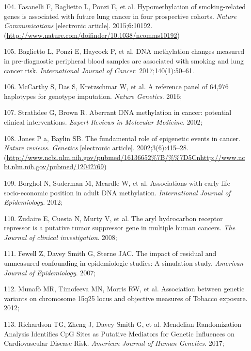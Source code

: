 \documentclass[11pt,twoside]{bristolthesis}
\newenvironment{cslreferences}%
  {}%
  {\par}
\begin{document}
\begin{cslreferences}
\leavevmode\hypertarget{ref-Fasanelli2015}{}%
104. Fasanelli F, Baglietto L, Ponzi E, et al. Hypomethylation of smoking-related genes is associated with future lung cancer in four prospective cohorts. \emph{Nature Communications} {[}electronic article{]}. 2015;6:10192. (\url{http://www.nature.com/doifinder/10.1038/ncomms10192})

\leavevmode\hypertarget{ref-Baglietto2017}{}%
105. Baglietto L, Ponzi E, Haycock P, et al. DNA methylation changes measured in pre-diagnostic peripheral blood samples are associated with smoking and lung cancer risk. \emph{International Journal of Cancer}. 2017;140(1):50--61.

\leavevmode\hypertarget{ref-McCarthy2016}{}%
106. McCarthy S, Das S, Kretzschmar W, et al. A reference panel of 64,976 haplotypes for genotype imputation. \emph{Nature Genetics}. 2016;

\leavevmode\hypertarget{ref-Strathdee2002}{}%
107. Strathdee G, Brown R. Aberrant DNA methylation in cancer: potential clinical interventions. \emph{Expert Reviews in Molecular Medicine}. 2002;

\leavevmode\hypertarget{ref-Jones2002}{}%
108. Jones P a, Baylin SB. The fundamental role of epigenetic events in cancer. \emph{Nature reviews. Genetics} {[}electronic article{]}. 2002;3(6):415--28. (\url{http://www.ncbi.nlm.nih.gov/pubmed/16136652\%7B/\%\%7D5Cnhttp://www.ncbi.nlm.nih.gov/pubmed/12042769})

\leavevmode\hypertarget{ref-Borghol2012}{}%
109. Borghol N, Suderman M, Mcardle W, et al. Associations with early-life socio-economic position in adult DNA methylation. \emph{International Journal of Epidemiology}. 2012;

\leavevmode\hypertarget{ref-Zudaire2008}{}%
110. Zudaire E, Cuesta N, Murty V, et al. The aryl hydrocarbon receptor repressor is a putative tumor suppressor gene in multiple human cancers. \emph{The Journal of clinical investigation}. 2008;

\leavevmode\hypertarget{ref-Fewell2007}{}%
111. Fewell Z, Davey Smith G, Sterne JAC. The impact of residual and unmeasured confounding in epidemiologic studies: A simulation study. \emph{American Journal of Epidemiology}. 2007;

\leavevmode\hypertarget{ref-Munafo2012}{}%
112. Munafò MR, Timofeeva MN, Morris RW, et al. Association between genetic variants on chromosome 15q25 locus and objective measures of Tobacco exposure. 2012;

\leavevmode\hypertarget{ref-Richardson2017}{}%
113. Richardson TG, Zheng J, Davey Smith G, et al. Mendelian Randomization Analysis Identifies CpG Sites as Putative Mediators for Genetic Influences on Cardiovascular Disease Risk. \emph{American Journal of Human Genetics}. 2017;


\end{cslreferences}
\end{document}

